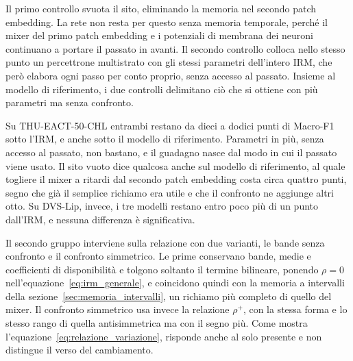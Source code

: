 Il primo controllo svuota il sito, eliminando la memoria nel secondo patch embedding. La rete non resta per questo senza memoria temporale, perché il mixer del primo patch embedding e i potenziali di membrana dei neuroni continuano a portare il passato in avanti. Il secondo controllo colloca nello stesso punto un percettrone multistrato con gli stessi parametri dell'intero IRM, che però elabora ogni passo per conto proprio, senza accesso al passato. Insieme al modello di riferimento, i due controlli delimitano ciò che si ottiene con più parametri ma senza confronto.

Su THU-EACT-50-CHL entrambi restano da dieci a dodici punti di Macro-F1 sotto l'IRM, e anche sotto il modello di riferimento. Parametri in più, senza accesso al passato, non bastano, e il guadagno nasce dal modo in cui il passato viene usato. Il sito vuoto dice qualcosa anche sul modello di riferimento, al quale togliere il mixer a ritardi dal secondo patch embedding costa circa quattro punti, segno che già il semplice richiamo era utile e che il confronto ne aggiunge altri otto. Su DVS-Lip, invece, i tre modelli restano entro poco più di un punto dall'IRM, e nessuna differenza è significativa.

Il secondo gruppo interviene sulla relazione con due varianti, le bande senza confronto e il confronto simmetrico. Le prime conservano bande, medie e coefficienti di disponibilità e tolgono soltanto il termine bilineare, ponendo $\rho=0$ nell'equazione~\eqref{eq:irm_generale}, e coincidono quindi con la memoria a intervalli della sezione~\ref{sec:memoria_intervalli}, un richiamo più completo di quello del mixer. Il confronto simmetrico usa invece la relazione $\rho^{+}$, con la stessa forma e lo stesso rango di quella antisimmetrica ma con il segno più. Come mostra l'equazione~\eqref{eq:relazione_variazione}, risponde anche al solo presente e non distingue il verso del cambiamento.

